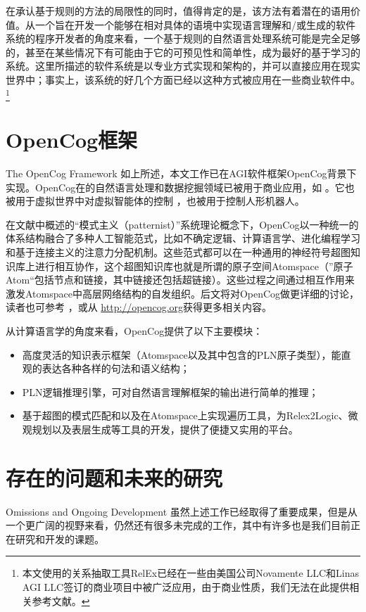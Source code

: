 在承认基于规则的方法的局限性的同时，值得肯定的是，该方法有着潜在的语用价值。从一个旨在开发一个能够在相对具体的语境中实现语言理解和/或生成的软件系统的程序开发者的角度来看，一个基于规则的自然语言处理系统可能是完全足够的，甚至在某些情况下有可能由于它的可预见性和简单性，成为最好的基于学习的系统。这里所描述的软件系统是以专业方式实现和架构的，并可以直接应用在现实世界中；事实上，该系统的好几个方面已经以这种方式被应用在一些商业软件中。\footnote{本文使用的关系抽取工具RelEx已经在一些由美国公司Novamente LLC和Linas AGI LLC签订的商业项目中被广泛应用，由于商业性质，我们无法在此提供相关参考文献。}

\section{OpenCog框架}{The OpenCog Framework}
如上所述，本文工作已在AGI软件框架OpenCog背景下实现。OpenCog在的自然语言处理和数据挖掘领域已被用于商业应用，如 \cite{Goertzel2006}。它也被用于虚拟世界中对虚拟智能体的控制\cite{Goertzel2008d}  \cite{Goertzel2011x}，也被用于控制人形机器人\cite{Goertzel2010h}。

在文献\cite{GoertzelHP}中概述的“模式主义（patternist）”系统理论概念下，OpenCog以一种统一的体系结构融合了多种人工智能范式，比如不确定逻辑、计算语言学、进化编程学习和基于连接主义的注意力分配机制。这些范式都可以在一种通用的神经符号超图知识库上进行相互协作，这个超图知识库也就是所谓的原子空间Atomspace（”原子Atom“包括节点和链接，其中链接还包括超链接）。这些过程之间通过相互作用来激发Atomspace中高层网络结构的自发组织。后文将对OpenCog做更详细的讨论，读者也可参考 \cite{Goertzel2010h}，或从 \url{http://opencog.org}获得更多相关内容。

从计算语言学的角度来看，OpenCog提供了以下主要模块：
\begin{itemize}
\item 高度灵活的知识表示框架（Atomspace以及其中包含的PLN原子类型），能直观的表达各种各样的句法和语义结构；
\item PLN逻辑推理引擎，可对自然语言理解框架的输出进行简单的推理；
\item 基于超图的模式匹配和以及在Atomspace上实现遍历工具，为Relex2Logic、微观规划以及表层生成等工具的开发，提供了便捷又实用的平台。
\end{itemize}

\section{存在的问题和未来的研究}{Omissions and Ongoing Development}
虽然上述工作已经取得了重要成果，但是从一个更广阔的视野来看，仍然还有很多未完成的工作，其中有许多也是我们目前正在研究和开发的课题。

